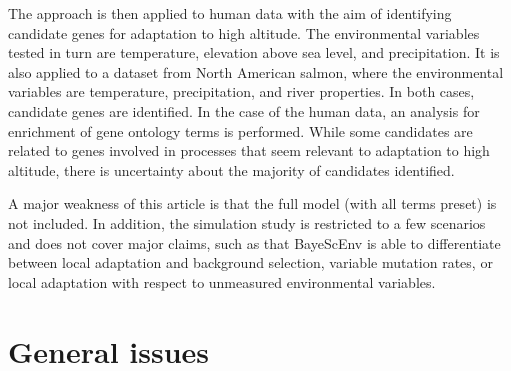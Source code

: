 \documentclass[11pt]{article}
\begin{document}
The approach is then applied to human data with the aim of identifying candidate genes for adaptation to high altitude. The environmental variables tested in turn are temperature, elevation above sea level, and precipitation. It is also applied to a dataset from North American salmon, where the environmental variables are temperature, precipitation, and river properties. In both cases, candidate genes are identified. In the case of the human data, an analysis for enrichment of gene ontology terms is performed. While some candidates are related to genes involved in processes that seem relevant to adaptation to high altitude, there is uncertainty about the majority of candidates identified.

A major weakness of this article is that the full model (with all terms preset) is not included. In addition, the simulation study is restricted to a few scenarios and does not cover major claims, such as that BayeScEnv is able to differentiate between local adaptation and background selection, variable mutation rates, or local adaptation with respect to unmeasured environmental variables.

\section{General issues}
\end{document}
